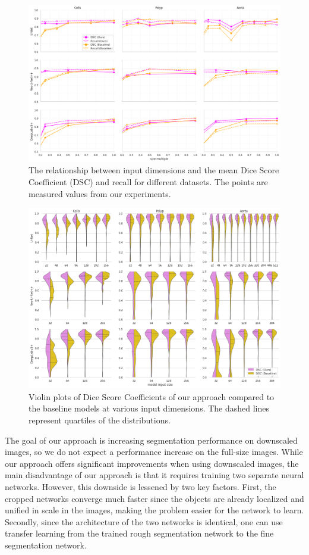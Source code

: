 \begin{figure}[H]
\centering
\includegraphics[width=\textwidth]{images/5/dsc-vs-size.png}
\caption{The relationship between input dimensions and the mean Dice Score Coefficient (DSC) and recall for different datasets. The points are measured values from our experiments.\label{fig:dsc-vs-size}}
\end{figure}

\begin{figure}[H]
\centering
\includegraphics[width=\textwidth]{images/5/violin-plots.png}
\caption{Violin plots of Dice Score Coefficients of our approach compared to the baseline models at various input dimensions. The dashed lines represent quartiles of the distributions.\label{fig:box-plots}}
\end{figure}

The goal of our approach is increasing segmentation performance on downscaled images, so we do not expect a performance increase on the full-size images. While our approach offers significant improvements when using downscaled images, the main disadvantage of our approach is that it requires training two separate neural networks. However, this downside is lessened by two key factors. First, the cropped networks converge much faster since the objects are already localized and unified in scale in the images, making the problem easier for the network to learn. Secondly, since the architecture of the two networks is identical, one can use transfer learning from the trained rough segmentation network to the fine segmentation network.

